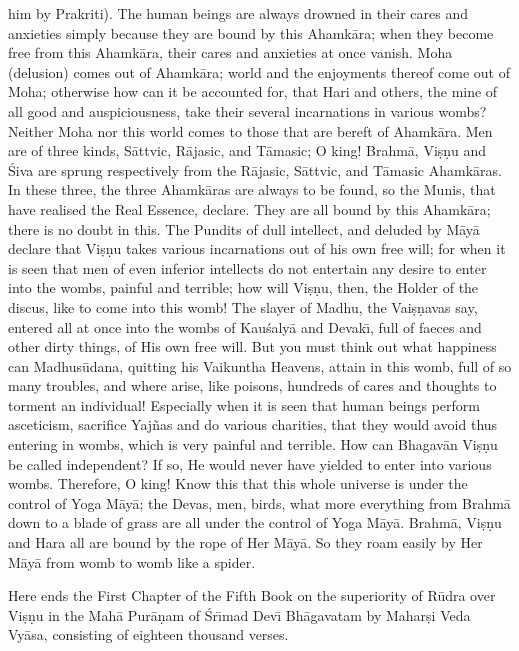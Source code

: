 him by Prakriti). The human beings are always drowned in their cares and anxieties simply because they are bound by this Ahamk\=ara; when they become free from this Ahamk\=ara, their cares and anxieties at once vanish. Moha (delusion) comes out of Ahamk\=ara; world and the enjoyments thereof come out of Moha; otherwise how can it be accounted for, that Hari and others, the mine of all good and auspiciousness, take their several incarnations in various wombs? Neither Moha nor this world comes to those that are bereft of Ahamk\=ara. Men are of three kinds, S\=attvic, R\=ajasic, and T\=amasic; O king! Brahm\=a, Vi\d{s}\d{n}u and \'Siva are sprung respectively from the R\=ajasic, S\=attvic, and T\=amasic Ahamk\=aras. In these three, the three Ahamk\=aras are always to be found, so the Munis, that have realised the Real Essence, declare. They are all bound by this Ahamk\=ara; there is no doubt in this. The Pundits of dull intellect, and deluded by M\=ay\=a declare that Vi\d{s}\d{n}u takes various incarnations out of his own free will; for when it is seen that men of even inferior intellects do not entertain any desire to enter into the wombs, painful and terrible; how will Vi\d{s}\d{n}u, then, the Holder of the discus, like to come into this womb! The slayer of Madhu, the Vai\d{s}\d{n}avas say, entered all at once into the wombs of Kau\'saly\=a and Devak\={\i}, full of faeces and other dirty things, of His own free will. But you must think out what happiness can Madhus\=udana, quitting his Vaikuntha Heavens, attain in this womb, full of so many troubles, and where arise, like poisons, hundreds of cares and thoughts to torment an individual! Especially when it is seen that human beings perform asceticism, sacrifice Yaj\~nas and do various charities, that they would avoid thus entering in wombs, which is very painful and terrible. How can Bhagav\=an Vi\d{s}\d{n}u be called independent? If so, He would never have yielded to enter into various wombs. Therefore, O king! Know this that this whole universe is under the control of Yoga M\=ay\=a; the Devas, men, birds, what more everything from Brahm\=a down to a blade of grass are all under the control of Yoga M\=ay\=a. Brahm\=a, Vi\d{s}\d{n}u and Hara all are bound by the rope of Her M\=ay\=a. So they roam easily by Her M\=ay\=a from womb to womb like a spider.

Here ends the First Chapter of the Fifth Book on the superiority of R\=udra over Vi\d{s}\d{n}u in the Mah\=a Pur\=a\d{n}am of \'Sr\={\i}mad Dev\={\i} Bh\=agavatam by Mahar\d{s}i Veda Vy\=asa, consisting of eighteen thousand verses.



